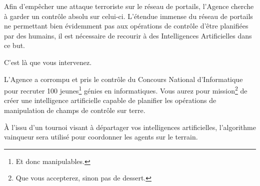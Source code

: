 Afin d'empêcher une attaque terroriste sur le réseau de portails, l'Agence
cherche à garder un contrôle absolu sur celui-ci. L'étendue immense du réseau
de portails ne permettant bien évidemment pas aux opérations de contrôle d'être
planifiées par des humains, il est nécessaire de recourir à des Intelligences
Artificielles dans ce but.

C'est là que vous intervenez.

L'Agence a corrompu et pris le contrôle du Concours National d'Informatique
pour recruter 100 jeunes\footnote{Et donc manipulables.} génies en
informatiques. Vous aurez pour mission\footnote{Que vous accepterez, sinon pas
de dessert.\footnotemark} de
créer une intelligence artificielle capable de planifier les opérations de
manipulation de champs de contrôle sur terre.

À l'issu d'un tournoi visant à départager vos intelligences artificielles,
l'algorithme vainqueur sera utilisé pour coordonner les agents sur le terrain.
